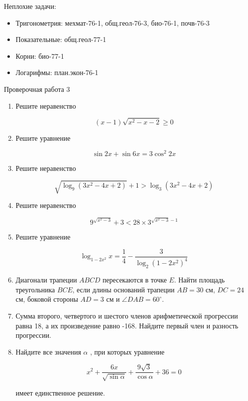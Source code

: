 \documentclass[11pt,a5paper]{report}
\begin{document}
Неплохие задачи:

\begin{itemize}
\item Тригонометрия: мехмат-76-1, общ.геол-76-3, био-76-1, почв-76-3

\item Показательные: общ.геол-77-1

\item Корни: био-77-1

\item Логарифмы: план.экон-76-1

\end{itemize}

\newpage

\begin{center}
Проверочная работа 3


\end{center}

\begin{enumerate}

\item Решите неравенство

$$(x-1)\sqrt{x^2-x-2}\geqslant 0$$

\item Решите уравнение

$$\sin 2x + \sin 6x = 3\cos^2 2x$$

\item Решите неравенство

$$\sqrt{\log_9(3x^2-4x+2)}+1>\log_3(3x^2-4x+2)$$

\item Решите неравенство

$$9^{\sqrt{x^2-3}}+3<28\times 3^{\sqrt{x^2-3}-1}$$

\item Решите уравнение

$$\log_{1-2x^2}x=\frac{1}{4}-\frac{3}{\log_{2}(1-2x^2)^4}$$

\item Диагонали трапеции $ABCD$ пересекаются в точке $E$. Найти площадь треугольника $BCE$, если длины оснований трапеции $AB=30$ см, $DC=24$ см, боковой стороны $AD=3$ см и $\angle DAB=60^{\circ}$. 

\item Сумма второго, четвертого и шестого членов арифметической прогрессии равна 18, а их произведение равно -168. Найдите первый член и разность прогрессии.

\item Найдите все значения $\alpha$ , при которых уравнение

$$x^2+\frac{6x}{\sqrt{\sin\alpha}}+\frac{9\sqrt{3}}{\cos\alpha}+36=0$$

имеет единственное решение.

\end{enumerate}
\end{document}
